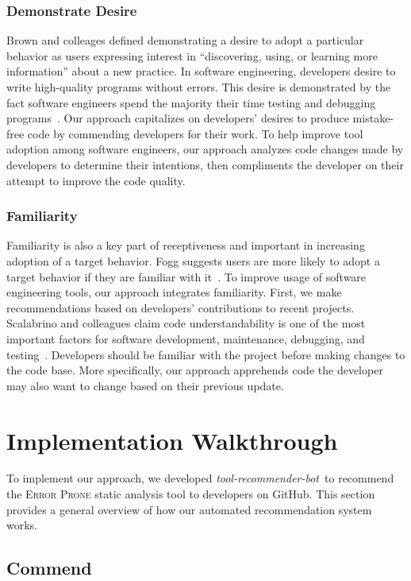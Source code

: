 \documentclass[sigconf,review,anonymous]{acmart}
\newcommand{\tool}{\textsl{tool-recommender-bot}}
\begin{document}
\subsubsection{Demonstrate Desire}

Brown and colleages defined demonstrating a desire to adopt a particular behavior as users expressing interest in ``discovering, using, or learning more information'' about a new practice. In software engineering, developers desire to write high-quality programs without errors. This desire is demonstrated by the fact software engineers spend the majority their time testing and debugging programs~\cite{NIST}. Our approach capitalizes on developers' desires to produce mistake-free code by commending developers for their work. To help improve tool adoption among software engineers, our approach analyzes code changes made by developers to determine their intentions, then compliments the developer on their attempt to improve the code quality.

\subsubsection{Familiarity}

Familiarity is also a key part of receptiveness and important in increasing adoption of a target behavior. Fogg suggests users are more likely to adopt a target behavior if they are familiar with it~\cite{FoggPersuasive}. To improve usage of software engineering tools, our approach integrates familiarity. First, we make recommendations based on developers' contributions to recent projects. Scalabrino and colleagues claim code understandability is one of the most important factors for software development, maintenance, debugging, and testing~\cite{Scalabrino2017Understandability}. Developers should be familiar with the project before making changes to the code base. More specifically, our approach apprehends code the developer may also want to change based on their previous update.

\section{Implementation Walkthrough}

To implement our approach, we developed \tool~to recommend the \textsc{Error Prone} static analysis tool to developers on GitHub. This section provides a general overview of how our automated recommendation system works.

\subsection{Commend}
\end{document}
